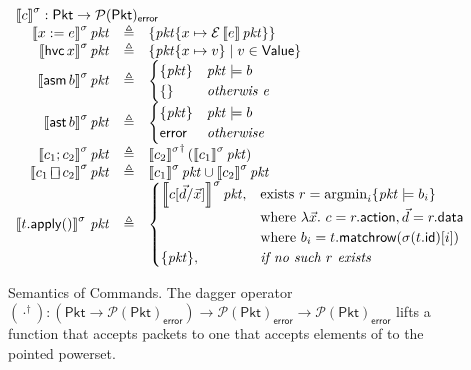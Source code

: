 \documentclass{article}
\newcommand{\pkt}{\mathit{pkt}}
\newcommand{\error}{\mathsf{error}}
\newcommand{\denote}[1]{\left\llbracket#1\right\rrbracket}
\newcommand{\edenote}[1]{\mathcal{E}\denote{#1}}
\newcommand{\Value}{\mathsf{Value}}
\newcommand{\Pkt}{\mathsf{Pkt}}
\newcommand{\Row}{\mathsf{Row}}
\newcommand{\action}{\mathsf{action}}
\newcommand{\data}{\mathsf{data}}
\newcommand{\id}{\mathsf{id}}
\newcommand{\assert}{\mathop{\mathsf{ast}}}
\newcommand{\assume}{\mathop{\mathsf{asm}}}
\newcommand{\apply}{\mathsf{apply}}
\newcommand{\choiceop}{\rotatebox[origin=c]{90}{$\sqsubset\!\!\!\sqsupset$}}
\newcommand{\choice}{\mathbin{\choiceop}}
\newcommand{\havoc}[1]{\mathop{\mathsf{hvc}}#1}
\newcommand{\argmin}{\mathop{\textrm{argmin}}}
\newcommand{\matchrow}{\mathsf{matchrow}}
\begin{document}
\begin{figure}[htp]
  \[\begin{array}{r >{\triangleq}cl}
  \multicolumn{3}{l}{\denote{c}^\sigma : \Pkt \to \mathcal{P}(\Pkt)_\error }\\
  \denote{x := e}^\sigma\pkt && \{\pkt\{x \mapsto \edenote{e}\pkt\}\} \\
  \denote{\havoc x}^\sigma\pkt && \{ \pkt\{x \mapsto v\} \mid v \in \Value \} \\
    \denote{\assume b}^\sigma\pkt &&
    \begin{cases}
      \{\pkt\} & \pkt \models b \\
      \{\} & \textit{otherwis
e} \\
    \end{cases}\\
    \denote{\assert b}^\sigma\pkt &&
    \begin{cases}
      \{\pkt\} & \pkt \models b \\
      \error & \textit{otherwise}
    \end{cases} \\
    \denote{c_1;c_2}^\sigma\pkt&&
    {\denote{c_2}^\sigma}^\dagger\left(\denote{c_1}^\sigma\pkt\right)\\
    \denote{c_1 \choice c_2}^\sigma\pkt &&
    \denote{c_1}^\sigma\pkt \cup \denote{c_2}^\sigma\pkt \\
    \denote{t.\apply()}^\sigma\,\pkt &&
    \begin{cases}
      \denote{c[\vec d/\vec x]}^\sigma\pkt,
      & \text{exists}~r = \argmin_i\{\pkt \models b_i\} \\
      & \text{where}~\lambda \vec x.~c = r.\action, \vec d = r.\data \\
      & \text{where}~b_i = t.\matchrow(\sigma(t.\id)[i]) \\
      \{\pkt\}, & \textit{if no such } r \textit{ exists}
    \end{cases}
  \end{array}\]
  \caption{Semantics of Commands. The dagger operator $(\cdot^\dagger) : (\Pkt \to
    \mathcal{P}(\Pkt)_\error) \to \mathcal{P}(\Pkt)_\error \to
    \mathcal{P}(\Pkt)_\error$ lifts a function that accepts packets to one that
    accepts elements of to the pointed powerset.}
  \label{fig:com-sem}
\end{figure}
\end{document}
